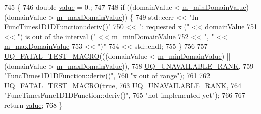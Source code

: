 \begin{DoxyCode}
745 \{
746   \textcolor{keywordtype}{double} \hyperlink{class_q_u_e_s_o_1_1_func_times_func1_d1_d_function_adebec22c4730abfe9d5000785a77d000}{value} = 0.;
747 
748   \textcolor{keywordflow}{if} ((domainValue < \hyperlink{class_q_u_e_s_o_1_1_base1_d1_d_function_a7b18b3854ee74ef5befbc67b75ebbdc5}{m\_minDomainValue}) || (domainValue > 
      \hyperlink{class_q_u_e_s_o_1_1_base1_d1_d_function_aa0025999ccab2145cd46c0a81e260e8f}{m\_maxDomainValue})) \{
749     std::cerr << \textcolor{stringliteral}{"In FuncTimes1D1DFunction::deriv()"}
750               << \textcolor{stringliteral}{": requested x ("}            << domainValue
751               << \textcolor{stringliteral}{") is out of the interval ("} << \hyperlink{class_q_u_e_s_o_1_1_base1_d1_d_function_a7b18b3854ee74ef5befbc67b75ebbdc5}{m\_minDomainValue}
752               << \textcolor{stringliteral}{", "}                         << \hyperlink{class_q_u_e_s_o_1_1_base1_d1_d_function_aa0025999ccab2145cd46c0a81e260e8f}{m\_maxDomainValue}
753               << \textcolor{stringliteral}{")"}
754               << std::endl;
755   \}
756 
757   \hyperlink{_defines_8h_a56d63d18d0a6d45757de47fcc06f574d}{UQ\_FATAL\_TEST\_MACRO}(((domainValue < \hyperlink{class_q_u_e_s_o_1_1_base1_d1_d_function_a7b18b3854ee74ef5befbc67b75ebbdc5}{m\_minDomainValue}) || (domainValue 
      > \hyperlink{class_q_u_e_s_o_1_1_base1_d1_d_function_aa0025999ccab2145cd46c0a81e260e8f}{m\_maxDomainValue})),
758                       \hyperlink{namespace_q_u_e_s_o_a7d4679800a430ae8e473c1c7bc0bfb21}{UQ\_UNAVAILABLE\_RANK},
759                       \textcolor{stringliteral}{"FuncTimes1D1DFunction::deriv()"},
760                       \textcolor{stringliteral}{"x out of range"});
761 
762   \hyperlink{_defines_8h_a56d63d18d0a6d45757de47fcc06f574d}{UQ\_FATAL\_TEST\_MACRO}(\textcolor{keyword}{true},
763                       \hyperlink{namespace_q_u_e_s_o_a7d4679800a430ae8e473c1c7bc0bfb21}{UQ\_UNAVAILABLE\_RANK},
764                       \textcolor{stringliteral}{"FuncTimesFunc1D1DFunction::deriv()"},
765                       \textcolor{stringliteral}{"not implemented yet"});
766 
767   \textcolor{keywordflow}{return} \hyperlink{class_q_u_e_s_o_1_1_func_times_func1_d1_d_function_adebec22c4730abfe9d5000785a77d000}{value};
768 \}
\end{DoxyCode}
